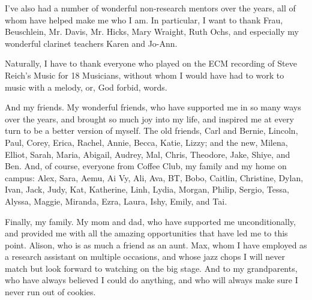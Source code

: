 \documentclass[12pt]{report}
\begin{document}
I've also had a number of wonderful non-research mentors over the years, all of whom have helped make me who I am. In particular, I want to thank Frau, Beuschlein, Mr. Davis, Mr. Hicks, Mary Wraight, Ruth Ochs, and especially my wonderful clarinet teachers Karen and Jo-Ann.

Naturally, I have to thank everyone who played on the ECM recording of Steve Reich's Music for 18 Musicians, without whom I would have had to work to music with a melody, or, God forbid, words. 

And my friends. My wonderful friends, who have supported me in so many ways over the years, and brought so much joy into my life, and inspired me at every turn to be a better version of myself. The old friends, Carl and Bernie, Lincoln, Paul, Corey, Erica, Rachel, Annie, Becca, Katie, Lizzy; and the new, Milena, Elliot, Sarah, Maria, Abigail, Audrey, Mal, Chris, Theodore, Jake, Shiye, and Ben. And, of course, everyone from Coffee Club, my family and my home on campus: Alex, Sara, Aemu, Ai Vy, Ali, Ava, BT, Bobo, Caitlin, Christine, Dylan, Ivan, Jack, Judy, Kat, Katherine, Linh, Lydia, Morgan, Philip, Sergio, Tessa, Alyssa, Maggie, Miranda, Ezra, Laura, Ishy, Emily, and Tai.

Finally, my family. My mom and dad, who have supported me unconditionally, and provided me with all the amazing opportunities that have led me to this point. Alison, who is as much a friend as an aunt. Max, whom I have employed as a research assistant on multiple occasions, and whose jazz chops I will never match but look forward to watching on the big stage. And to my grandparents, who have always believed I could do anything, and who will always make sure I never run out of cookies. 
\end{document}
